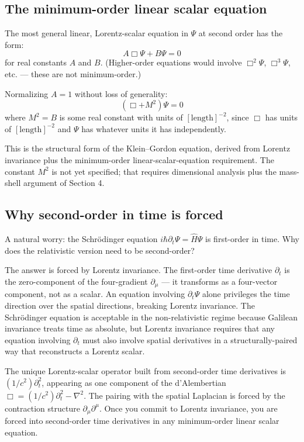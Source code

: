 \documentclass[11pt,a4paper]{article}
\begin{document}
\subsection{The minimum-order linear scalar equation}

The most general linear, Lorentz-scalar equation in $\Psi$ at second order has the form:
\[
A\Box\Psi + B\Psi = 0
\]
for real constants $A$ and $B$. (Higher-order equations would involve $\Box^2\Psi$, $\Box^3\Psi$, etc. --- these are not minimum-order.)

Normalizing $A = 1$ without loss of generality:
\[
(\Box + M^{2})\Psi = 0
\]
where $M^2 = B$ is some real constant with units of $[\text{length}]^{-2}$, since $\Box$ has units of $[\text{length}]^{-2}$ and $\Psi$ has whatever units it has independently.

This is the structural form of the Klein--Gordon equation, derived from Lorentz invariance plus the minimum-order linear-scalar-equation requirement. The constant $M^2$ is not yet specified; that requires dimensional analysis plus the mass-shell argument of Section 4.

\subsection{Why second-order in time is forced}

A natural worry: the Schr\"odinger equation $i\hbar\partial_t\Psi = \hat{H}\Psi$ is first-order in time. Why does the relativistic version need to be second-order?

The answer is forced by Lorentz invariance. The first-order time derivative $\partial_t$ is the zero-component of the four-gradient $\partial_\mu$ --- it transforms as a four-vector component, not as a scalar. An equation involving $\partial_t\Psi$ alone privileges the time direction over the spatial directions, breaking Lorentz invariance. The Schr\"odinger equation is acceptable in the non-relativistic regime because Galilean invariance treats time as absolute, but Lorentz invariance requires that any equation involving $\partial_t$ must also involve spatial derivatives in a structurally-paired way that reconstructs a Lorentz scalar.

The unique Lorentz-scalar operator built from second-order time derivatives is $(1/c^2)\partial_t^2$, appearing as one component of the d'Alembertian $\Box = (1/c^2)\partial_t^2 - \nabla^2$. The pairing with the spatial Laplacian is forced by the contraction structure $\partial_\mu\partial^\mu$. Once you commit to Lorentz invariance, you are forced into second-order time derivatives in any minimum-order linear scalar equation.
\end{document}
